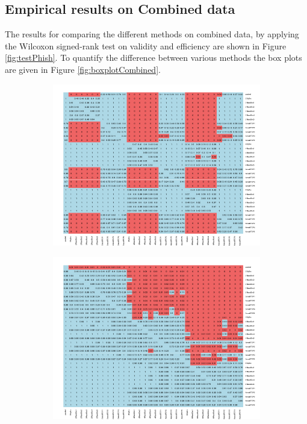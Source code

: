 \documentclass[main]{subfiles}
\begin{document}
\subsection{Empirical results on Combined data}
The results for comparing the different methods on combined data, by applying the Wilcoxon signed-rank test on validity and efficiency are shown in Figure \ref{fig:testPhish}. To quantify the difference between various methods the box plots are given in Figure \ref{fig:boxplotCombined}.
\begin{figure}[!h]
\centering
\begin{subfigure}{.5\textwidth}
  \centering
  \includegraphics[width=\linewidth]{images/heatmapCombined}
\end{subfigure}%
\begin{subfigure}{.5\textwidth}
  \centering
  \includegraphics[width=\linewidth]{images/heatmapCombined_eff}

\end{subfigure}
\end{figure}
\end{document}
